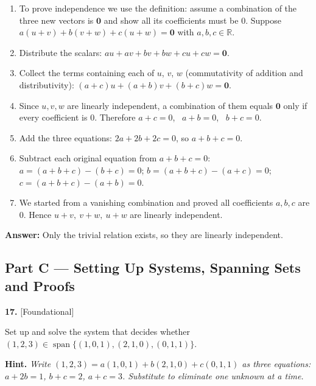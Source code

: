 \documentclass[11pt]{article}
\begin{document}
\begin{tcolorbox}[breakable,colback=ans,colframe=ansb,boxrule=0.5pt,left=4pt,right=4pt,top=2pt,bottom=2pt]\begin{enumerate}[leftmargin=2.2em,itemsep=1pt,topsep=1pt,label=\textbf{Step \arabic*.}]\item To prove independence we use the definition: assume a combination of the three new vectors is $\mathbf 0$ and show all its coefficients must be $0$. Suppose $a(u+v)+b(v+w)+c(u+w)=\mathbf 0$ with $a,b,c\in\mathbb{R}$.
\item Distribute the scalars: $au+av+bv+bw+cu+cw=\mathbf 0$.
\item Collect the terms containing each of $u$, $v$, $w$ (commutativity of addition and distributivity): $(a+c)u+(a+b)v+(b+c)w=\mathbf 0$.
\item Since $u,v,w$ are linearly independent, a combination of them equals $\mathbf 0$ only if every coefficient is $0$. Therefore $a+c=0$, \ $a+b=0$, \ $b+c=0$.
\item Add the three equations: $2a+2b+2c=0$, so $a+b+c=0$.
\item Subtract each original equation from $a+b+c=0$: $a=(a+b+c)-(b+c)=0$; $b=(a+b+c)-(a+c)=0$; $c=(a+b+c)-(a+b)=0$.
\item We started from a vanishing combination and proved all coefficients $a,b,c$ are $0$. Hence $u+v,\ v+w,\ u+w$ are linearly independent.
\end{enumerate}\textbf{Answer:} Only the trivial relation exists, so they are linearly independent.\end{tcolorbox}
\par\vspace{2pt}
\subsection*{\normalsize\color{ink} Part C --- Setting Up Systems, Spanning Sets and Proofs}
\begin{minipage}{\linewidth}\textbf{17.} \hfill{\scriptsize\color{ink}[Foundational]}\par\nopagebreak Set up and solve the system that decides whether $(1,2,3)\in\operatorname{span}\{(1,0,1),(2,1,0),(0,1,1)\}$.
\par\smallskip\begingroup\small\color{ink}\textbf{Hint.} \textit{Write $(1,2,3)=a(1,0,1)+b(2,1,0)+c(0,1,1)$ as three equations: $a+2b=1$, $b+c=2$, $a+c=3$. Substitute to eliminate one unknown at a time.}\endgroup
\end{minipage}\par\nopagebreak
\end{document}
